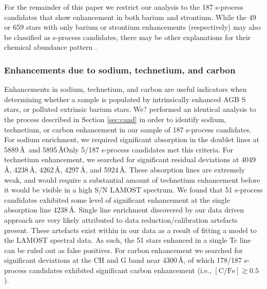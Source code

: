 \documentclass[a4paper,fleqn,usenatbib]{mnras}
\begin{document}
For the remainder of this paper we restrict our analysis to the 187 s-process candidates that show enhancement in both barium and strontium. While the 49 or 659 stars with only barium or strontium enhancements (respectively) may also be classified as s-process candidates, there may be other explanations for their chemical abundance pattern \citep[e.g.,][]{maiorca2011}. 


\subsubsection{Enhancements due to sodium, technetium, and carbon} \label{sec:other enhancements}
Enhancements in sodium, technetium, and carbon are useful indicators when determining whether a sample is populated by intrinsically enhanced AGB S stars, or polluted extrinsic barium stars. We? performed an identical analysis to the process described in Section \ref{sec:cand} in order to identify sodium, technetium, or carbon enhancement in our sample of 187 s-process candidates. For sodium enrichment, we required significant absorption in the doublet lines at 5889\,\AA\ and 5895\,\AA\. Only 5/187 s-process candidates met this criteria. For technetium enhancement, we searched for significant residual deviations at 4049\,\AA, 4238\,\AA, 4262\,\AA, 4297\,\AA, and 5924\,\AA. These absorption lines are extremely weak, and would require a substantial amount of technetium enhancement before it would be visible in a high S/N LAMOST spectrum. We found that 51 s-process candidates exhibited some level of significant enhancement at the single absorption line 4238\,\AA. Single line enrichment discovered by our data driven approach are very likely attributed to data reduction/calibration artefacts present. These artefacts exist within in our data as a result of fitting a model to the LAMOST spectral data. As such, the 51 stars enhanced in a single Tc line can be ruled out as false positives. For carbon enhancement we searched for significant deviations at the CH and G band near 4300\,\AA, of which 178/187 s-process candidates exhibited significant carbon enhancement (i.e., $[\textrm{C/Fe}] \gtrsim 0.5$). 
\end{document}
